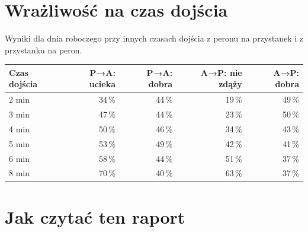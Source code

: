 \documentclass[10pt,a4paper]{article}
\begin{document}
\section{Wrażliwość na czas dojścia}
Wyniki dla dnia roboczego przy innych czasach dojścia z peronu na przystanek i z przystanku na peron.
{\small
\begin{center}\begin{tabular}{@{}l r r r r@{}}\toprule
Czas dojścia & P→A: ucieka & P→A: dobra & A→P: nie zdąży & A→P: dobra \\ \midrule
2 min & 34\,\% & 44\,\% & 19\,\% & 49\,\% \\
3 min & 47\,\% & 44\,\% & 23\,\% & 50\,\% \\
4 min & 50\,\% & 46\,\% & 34\,\% & 43\,\% \\
5 min & 53\,\% & 49\,\% & 42\,\% & 41\,\% \\
6 min & 58\,\% & 44\,\% & 51\,\% & 37\,\% \\
8 min & 70\,\% & 40\,\% & 63\,\% & 37\,\% \\
\bottomrule\end{tabular}\end{center}}
\section*{Jak czytać ten raport}
\end{document}
